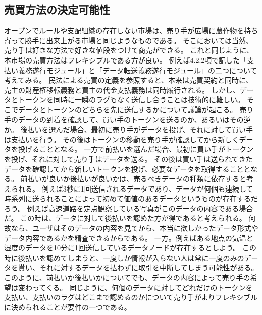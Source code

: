 \subsection{売買方法の決定可能性}
オープンでルールや支配組織の存在しない市場は、売り手が広場に農作物を持ち寄って勝手に出来上がる市場と同じようなものである。
そこにおいては当然、売り手は好きな方法で好きな値段をつけて商売ができる。
これと同じように、本市場の売買方法はフレキシブルである方が良い。
例えば4.2.2項で記した「支払い義務遂行モジュール」と「データ転送義務遂行モジュール」の二つについて考えてみる。
民法による売買の定義を参照すると、本来は売買契約と同時に、売主の財産権移転義務と買主の代金支払義務は同時履行される。
しかし、データとトークンを同時に一瞬のラグもなく送信し合うことは技術的に難しい。
そこでデータとトークンのどちらを先に送信するかについて議論が起こる。
売り手のデータの到着を確認して、買い手のトークンを送るのか、あるいはその逆か。
後払いを選んだ場合、最初に売り手がデータを投げ、それに対して買い手は支払いを行う。
その後はトークンの移動を売り手が確認してから新しくデータを投げることとなる。
一方で前払いを選んだ場合、最初に買い手がトークンを投げ、それに対して売り手はデータを送る。
その後は買い手は送られてきたデータを確認してから新しいトークンを投げ、必要なデータを取得することとなる。
前払いが良いか後払いが良いかは、売るべきデータの種類に依存すると考えられる。
例えば3秒に1回送信されるデータであり、データが何個も連続して時系列に送られることによって初めて価値のあるデータというものが存在するだろう。
例えば高速道路を定点観察している写真がこのデータの内容である場合だ。
この時は、データに対して後払いを認めた方が得であると考えられる。
何故なら、ユーザはそのデータの内容を見てから、本当に欲しかったデータ形式やデータ内容であるかを精査できるからである。
一方。例えばある地点の気温と湿度のデータを10分に1回送信しているデータノードが存在するとしよう。
この時に後払いを認めてしまうと、一度しか情報が入らない人は常に一度のみのデータを貰い、それに対するデータを払わずに取引を中断してしまう可能性がある。
このように、前払いか後払いかについてでも、データの内容によって売り手の希望は変わってくる。
同じように、何個のデータに対してどれだけのトークンを支払い、支払いのラグはどこまで認めるのかについて売り手がよりフレキシブルに決められることが要件の一つである。

